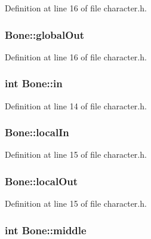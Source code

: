 Definition at line 16 of file character.\-h.

\hypertarget{class_bone_a1cf777430424819b626e9b2ae279ebbf}{
\subsubsection[{global\-Out}]{ Bone\-::global\-Out}}\label{class_bone_a1cf777430424819b626e9b2ae279ebbf}


Definition at line 16 of file character.\-h.

\hypertarget{class_bone_a49dad9d0358f3a7aba5228243d8c9165}{
\subsubsection[{in}]{\setlength{\rightskip}{0pt plus 5cm}int Bone\-::in}}\label{class_bone_a49dad9d0358f3a7aba5228243d8c9165}


Definition at line 14 of file character.\-h.

\hypertarget{class_bone_aa011083ee788dc21828a12e16d41b5d9}{
\subsubsection[{local\-In}]{ Bone\-::local\-In}}\label{class_bone_aa011083ee788dc21828a12e16d41b5d9}


Definition at line 15 of file character.\-h.

\hypertarget{class_bone_abb36ef81c46382b612813bb57eda48a7}{
\subsubsection[{local\-Out}]{ Bone\-::local\-Out}}\label{class_bone_abb36ef81c46382b612813bb57eda48a7}


Definition at line 15 of file character.\-h.

\hypertarget{class_bone_abfa4a8f98163370729030745a7f1a6fb}{
\subsubsection[{middle}]{\setlength{\rightskip}{0pt plus 5cm}int Bone\-::middle}}\label{class_bone_abfa4a8f98163370729030745a7f1a6fb}


